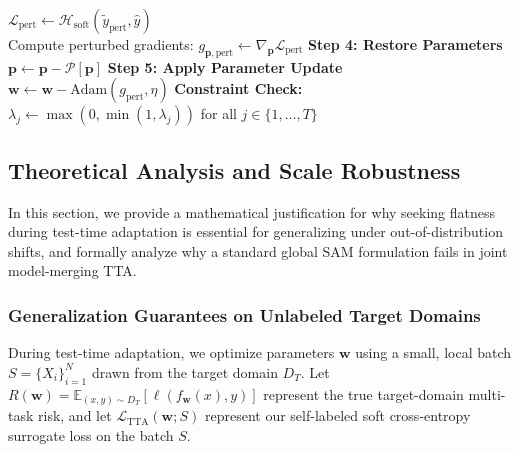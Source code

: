 \documentclass{article}
\begin{document}
\begin{algorithm}[ht]
\begin{algorithmic}[1]
        $\mathcal{L}_{\text{pert}} \leftarrow \mathcal{H}_{\text{soft}}(\tilde{y}_{\text{pert}}, \hat{y})$ \\
        Compute perturbed gradients: $g_{\mathbf{p},\text{pert}} \leftarrow \nabla_{\mathbf{p}} \mathcal{L}_{\text{pert}}$
        \STATE \textbf{Step 4: Restore Parameters} \\
                \STATE $\mathbf{p} \leftarrow \mathbf{p} - \mathcal{P}[\mathbf{p}]$
            \ENDIF
        \ENDFOR
        \STATE \textbf{Step 5: Apply Parameter Update} \\
        $\mathbf{w} \leftarrow \mathbf{w} - \text{Adam}(g_{\text{pert}}, \eta)$
        \STATE \textbf{Constraint Check:} \\
        $\lambda_j \leftarrow \max(0, \min(1, \lambda_j))$ for all $j \in \{1,\dots,T\}$
    \ENDFOR
\ENDFOR
\end{algorithmic}
\end{algorithm}

\subsection{Theoretical Analysis and Scale Robustness}
\label{subsec:theory}

In this section, we provide a mathematical justification for why seeking flatness during test-time adaptation is essential for generalizing under out-of-distribution shifts, and formally analyze why a standard global SAM formulation fails in joint model-merging TTA.

\subsubsection{Generalization Guarantees on Unlabeled Target Domains}

During test-time adaptation, we optimize parameters $\mathbf{w}$ using a small, local batch $S = \{X_i\}_{i=1}^N$ drawn from the target domain $D_T$. Let $R(\mathbf{w}) = \mathbb{E}_{(x, y) \sim D_T} [ \ell(f_{\mathbf{w}}(x), y) ]$ represent the true target-domain multi-task risk, and let $\mathcal{L}_{\text{TTA}}(\mathbf{w}; S)$ represent our self-labeled soft cross-entropy surrogate loss on the batch $S$. 
\end{document}
